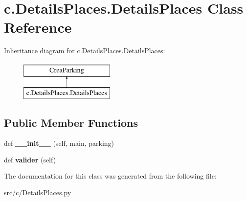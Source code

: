 \hypertarget{classc_1_1_details_places_1_1_details_places}{}\section{c.\+Details\+Places.\+Details\+Places Class Reference}
\label{classc_1_1_details_places_1_1_details_places}
Inheritance diagram for c.\+Details\+Places.\+Details\+Places\+:\begin{figure}[H]
\begin{center}
\leavevmode
\includegraphics[height=2.000000cm]{classc_1_1_details_places_1_1_details_places}
\end{center}
\end{figure}
\subsection*{Public Member Functions}
\begin{DoxyCompactItemize}
\item 
\hypertarget{classc_1_1_details_places_1_1_details_places_adcd6fa5c22b65b3ae0b8b74082b8b104}{}def {\bfseries \+\_\+\+\_\+init\+\_\+\+\_\+} (self, main, parking)\label{classc_1_1_details_places_1_1_details_places_adcd6fa5c22b65b3ae0b8b74082b8b104}

\item 
\hypertarget{classc_1_1_details_places_1_1_details_places_a07dcfd979996d4d577f3cf9f952816d6}{}def {\bfseries valider} (self)\label{classc_1_1_details_places_1_1_details_places_a07dcfd979996d4d577f3cf9f952816d6}

\end{DoxyCompactItemize}


The documentation for this class was generated from the following file\+:\begin{DoxyCompactItemize}
\item 
src/c/Details\+Places.\+py\end{DoxyCompactItemize}
